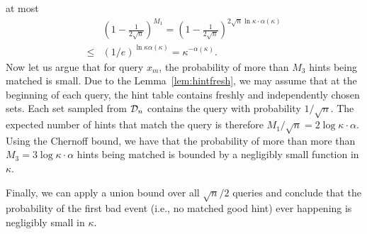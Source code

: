 at most 
    \begin{align*}
        & \left(1-\frac{1}{2\sqrt{n}}\right)^{M_1}  = \left(1-\frac{1}{2\sqrt{n}}\right)^{2\sqrt{n}\ln \kappa\cdot \alpha(\kappa)}  \\
        \le & \left(1/e\right)^{\ln \kappa \alpha(\kappa)}  = \kappa^{-\alpha(\kappa)}.
    \end{align*}
Now let us argue that for query $x_m$, the probability of more than $M_3$ hints being matched is small. 
    Due to the Lemma~\ref{lem:hintfresh}, 
we may assume that at the beginning of each query,
the hint table contains freshly and independently chosen sets.
Each set sampled from $\mathcal{D}_n$ 
contains the query with probability $1/\sqrt{n}$.
The expected number of hints that match
the query is therefore $M_1/\sqrt{n} = 2 \log \kappa  \cdot \alpha$.
    Using the Chernoff bound, we have that the probability of more than more than $M_3 = 3 \log \kappa \cdot \alpha$ hints being matched is bounded by
a negligibly small function in $\kappa$.

Finally, we can apply a union bound
over all $\sqrt{n}/2$ queries and conclude that 
the probability of 
the first bad event (i.e., no matched good hint)
ever happening is negligibly small in $\kappa$.

